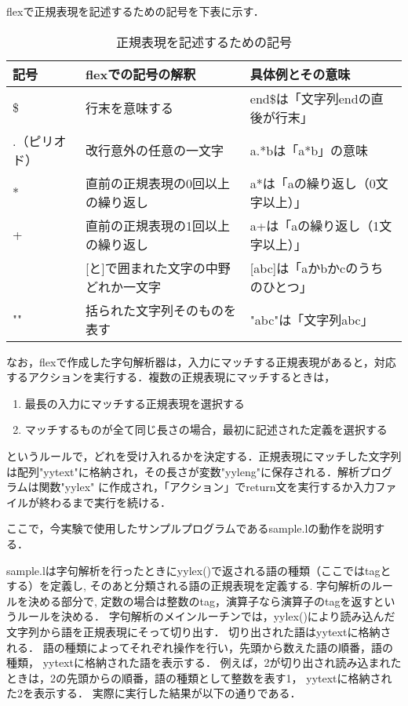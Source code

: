 \documentclass[a4j]{jsarticle}  %
\begin{document}
flexで正規表現を記述するための記号を下表に示す．

\begin{table}[htb]
  \begin{center}
    \caption{正規表現を記述するための記号}
    \begin{tabular}{l|l|l}\hline
      記号 & flexでの記号の解釈 & 具体例とその意味 \\ \hline
      \$ & 行末を意味する & end\$は「文字列endの直後が行末」 \\
      .（ピリオド） & 改行意外の任意の一文字 & a.*bは「a*b」の意味 \\
      * & 直前の正規表現の0回以上の繰り返し & a*は「aの繰り返し（0文字以上）」 \\
      + & 直前の正規表現の1回以上の繰り返し & a+は「aの繰り返し（1文字以上）」 \\ \relax
      [] & [と]で囲まれた文字の中野どれか一文字 & [abc]は「aかbかcのうちのひとつ」 \\
      "" & 括られた文字列そのものを表す & "abc"は「文字列abc」\\ \hline
    \end{tabular}
  \end{center}
\end{table}

なお，flexで作成した字句解析器は，入力にマッチする正規表現があると，対応するアクションを実行する．複数の正規表現にマッチするときは，

\begin{enumerate}
\item 最長の入力にマッチする正規表現を選択する
\item マッチするものが全て同じ長さの場合，最初に記述された定義を選択する
\end{enumerate}

というルールで，どれを受け入れるかを決定する．正規表現にマッチした文字列は配列"yytext"に格納され，その長さが変数"yyleng"に保存される．解析プログラムは関数"yylex"
に作成され，「アクション」でreturn文を実行するか入力ファイルが終わるまで実行を続ける．

ここで，今実験で使用したサンプルプログラムであるsample.lの動作を説明する．

sample.lは字句解析を行ったときにyylex()で返される語の種類（ここではtagとする）を定義し,
そのあと分類される語の正規表現を定義する.
字句解析のルールを決める部分で,
定数の場合は整数のtag，演算子なら演算子のtagを返すというルールを決める．
字句解析のメインルーチンでは，yylex()により読み込んだ文字列から語を正規表現にそって切り出す．
切り出された語はyytextに格納される．
語の種類によってそれぞれ操作を行い，先頭から数えた語の順番，語の種類，
yytextに格納された語を表示する．
例えば，2が切り出され読み込まれたときは，2の先頭からの順番，語の種類として整数を表す1，
yytextに格納された2を表示する．
実際に実行した結果が以下の通りである． 
\end{document}
